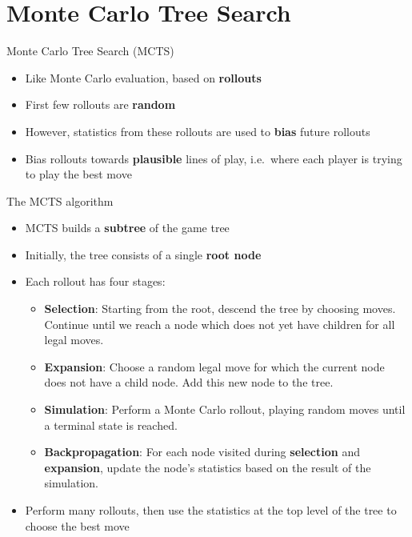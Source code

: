 \part{Monte Carlo Tree Search}
\frame{\partpage}

\begin{frame}{Monte Carlo Tree Search (MCTS)}
	\begin{itemize}
		\pause\item Like Monte Carlo evaluation, based on \textbf{rollouts}
		\pause\item First few rollouts are \textbf{random}
		\pause\item However, statistics from these rollouts are used to \textbf{bias} future rollouts
		\pause\item Bias rollouts towards \textbf{plausible} lines of play,
			i.e.\ where each player is trying to play the best move
	\end{itemize}
\end{frame}

\begin{frame}{The MCTS algorithm}
	\begin{itemize}
		\pause\item MCTS builds a \textbf{subtree} of the game tree
		\pause\item Initially, the tree consists of a single \textbf{root node}
		\pause\item Each rollout has four stages:
			\begin{itemize}
				\pause\item \textbf{Selection}: Starting from the root, descend the tree by choosing moves.
					Continue until we reach a node which does not yet have children for all legal moves.
				\pause\item \textbf{Expansion}: Choose a random legal move for which the current node does not have a child node.
					Add this new node to the tree.
				\pause\item \textbf{Simulation}: Perform a Monte Carlo rollout, playing random moves until a terminal state is reached.
				\pause\item \textbf{Backpropagation}: For each node visited during \textbf{selection} and \textbf{expansion},
					update the node's statistics based on the result of the simulation.
			\end{itemize}
		\pause\item Perform many rollouts, then use the statistics at the top level of the tree to choose the best move
	\end{itemize}
\end{frame}

